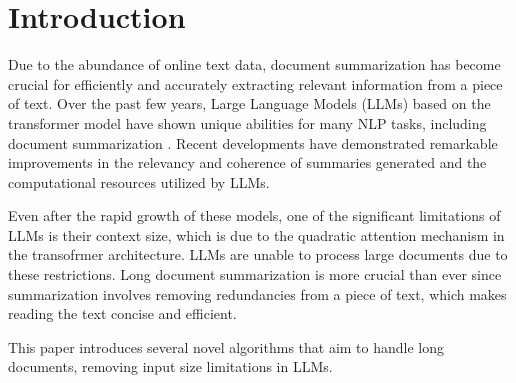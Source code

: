 \section{Introduction}
\label{sec:introduction}

Due to the abundance of online text data, document summarization has become crucial
for efficiently and accurately extracting relevant information from a piece of text.
Over the past few years, Large Language Models (LLMs) based on the transformer model
\cite{vaswani2017attention} have shown unique abilities for many NLP tasks, including
document summarization \cite{yadav2023state}.
Recent developments have demonstrated remarkable improvements in the relevancy and
coherence of summaries generated and the computational resources utilized by LLMs.

Even after the rapid growth of these models, one of the significant limitations of
LLMs is their context size, which is due to the quadratic attention mechanism in the
transofrmer architecture.
LLMs are unable to process large documents due to these restrictions.
Long document summarization is more crucial than ever since summarization involves
removing redundancies from a piece of text, which makes reading the text concise and
efficient.

This paper introduces several novel algorithms that aim to handle long documents,
removing input size limitations in LLMs.
